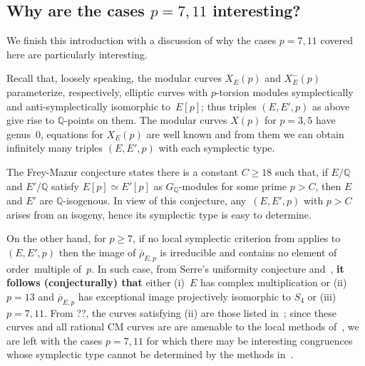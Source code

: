 \documentclass[12pt]{amsart}
\newcommand{\Q}{\mathbb{Q}}
\newcommand{\rhobar}{{\overline{\rho}}}
\numberwithin{equation}{section}
\theoremstyle{definition}
\theoremstyle{remark}
\begin{document}
\subsection{Why are the cases $p=7,11$ interesting?}
We finish this introduction with a discussion of why the cases $p=7,11$ covered here are particularly interesting. 

Recall that, loosely speaking, the modular curves $X_E(p)$ and $X_E^-(p)$ parameterize, respectively, elliptic curves with $p$-torsion modules symplectically and anti-symplectically isomorphic to~$E[p]$; thus triples $(E,E',p)$ as above give rise to $\Q$-points on them. The modular curves $X(p)$ for $p=3,5$ have genus~0, equations for $X_E(p)$ are well known and from them we can obtain infinitely many triples $(E,E',p)$ with each symplectic type.

The Frey-Mazur conjecture states there is a constant $C \geq 18$ such
that, if $E/\Q$ and $E'/\Q$ satisfy $E[p] \simeq E'[p]$ as
$G_\Q$-modules for some prime $p > C$, then $E$ and $E'$ are
$\Q$-isogenous. In view of this conjecture, any~$(E,E',p)$ with $p >
C$ arises from an isogeny, hence its symplectic type is easy to
determine. 

On the other hand, for $p \geq 7$, if no local
symplectic criterion from \cite{FKSym} applies to~$(E,E',p)$ then the image of $\rhobar_{E,p}$ is irreducible and contains no element of order~multiple of~$p$.
In such case, from Serre's uniformity conjecture and~\cite[Table~3]{Sutherland}, {\bf it follows (conjecturally) that} either (i)~$E$ has complex multiplication or (ii) $p=13$ and $\rhobar_{E,p}$ has exceptional image projectively isomorphic to $S_4$ or (iii) $p=7, 11$.
From ??, the curves satisfying (ii) are those listed in~\cite[Corollary~1.9]{BarinderCrem}; 
since these curves and all rational CM curves are
are amenable to the 
local methods of~\cite{FKSym}, we are left with the cases $p=7,11$ for
which there may be interesting congruences whose symplectic type cannot
be determined by the methods in~\cite{FKSym}. 

\end{document}
